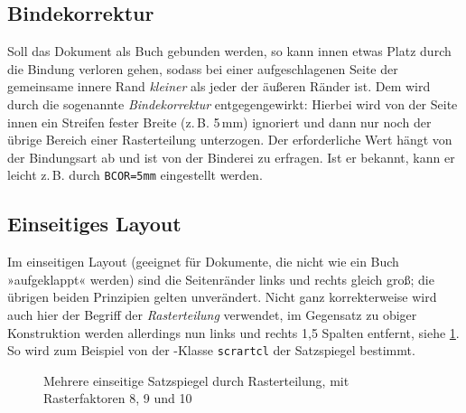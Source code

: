 \subsection{Bindekorrektur}

Soll das Dokument als Buch gebunden werden, so kann innen etwas Platz durch die
Bindung verloren gehen, sodass bei einer aufgeschlagenen Seite der gemeinsame
innere Rand \emph{kleiner} als jeder der äußeren Ränder ist. Dem wird durch die
sogenannte \emph{Bindekorrektur} entgegengewirkt: Hierbei wird von der Seite
innen ein Streifen fester Breite (z.\,B. 5\,mm) ignoriert und dann nur noch der
übrige Bereich einer Rasterteilung unterzogen. Der erforderliche Wert hängt von
der Bindungsart ab und ist von der Binderei zu erfragen. Ist er bekannt, kann er
leicht z.\,B. durch \verb!BCOR=5mm! eingestellt werden.

\subsection{Einseitiges Layout}

Im einseitigen Layout (geeignet für Dokumente, die nicht wie ein Buch
»aufgeklappt« werden) sind die Seitenränder links und rechts gleich groß; die
übrigen beiden Prinzipien gelten unverändert. Nicht ganz korrekterweise wird
auch hier der Begriff der \emph{Rasterteilung} verwendet, im Gegensatz zu obiger
Konstruktion werden allerdings nun links und rechts 1,5 Spalten entfernt, siehe
\cref{fig:einseitig}. So wird zum Beispiel von der -Klasse
\verb!scrartcl! der Satzspiegel bestimmt.

\begin{figure}
  \centering
  \quad
  \quad
  \caption{Mehrere einseitige Satzspiegel durch Rasterteilung, mit
    Rasterfaktoren 8, 9 und 10}
  \label{fig:einseitig}
\end{figure}

